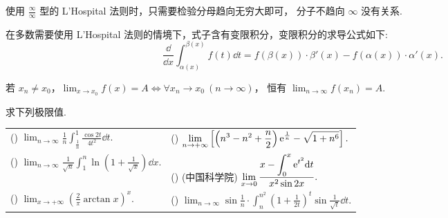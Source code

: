 使用 $\displaystyle\frac{\infty}{\infty}$ 型的 L'Hospital 法则时，只需要检验分母趋向无穷大即可，
分子不趋向 $\infty$ 没有关系.

在多数需要使用 L'Hospital 法则的情境下，式子含有变限积分，变限积分的求导公式如下:
$$\frac{\dd }{\dd x}\int_{\alpha(x)}^{\beta(x)}f(t)\dd t=f(\beta(x))\cdot\beta'(x)-f(\alpha(x))\cdot\alpha'(x).$$

\begin{theorem}[Heine 定理]
    若 $x_n\not=x_0$，$\displaystyle\lim_{x\to x_0}f(x)=A\Leftrightarrow\forall x_n\to x_0~ (n\to\infty)$，
    恒有 $\displaystyle\lim_{n\to\infty}f(x_n)=A.$
\end{theorem}

\begin{example}
    求下列极限值.
    \setcounter{magicrownumbers}{0}
    \begin{table}[H]
        \centering
        \begin{tabular}{l | l}
            (\rownumber{}) $\displaystyle\lim_{n\to\infty}\frac{1}{n}\int_{\frac{1}{n}}^{1}\frac{\cos 2t}{4t^2}\dd t.$              & (\rownumber{}) $\displaystyle\lim_{n\to+\infty}\left[\left(n^3-n^2+\frac{n}{2}\right)\mathrm{e} ^{\frac{1}{n}}-\sqrt{1+n^6}\right].$               \\
            (\rownumber{}) $\displaystyle\lim_{n\to\infty}\frac{1}{\sqrt{n}}\int_{1}^{n}\ln\left(1+\frac{1}{\sqrt{x}}\right)\dd x.$ & (\rownumber{}) (中国科学院) $\displaystyle\lim_{x\to0}\frac{\displaystyle x-\int_{0}^{x}\mathrm{e} ^{t^2}\dd t}{x^2\sin2x}.$                       \\
            (\rownumber{}) $\displaystyle\lim_{x\to +\infty}\left(\frac{2}{\pi}\arctan x\right)^x.$                                 & (\rownumber{}) $\displaystyle\lim_{n\to\infty}\sin\frac{1}{n}\cdot\int_{n}^{n^2}\left(1+\frac{1}{2t}\right)^t\sin\frac{1}{\sqrt{t}}\dd t.$
        \end{tabular}
    \end{table}
\end{example}
